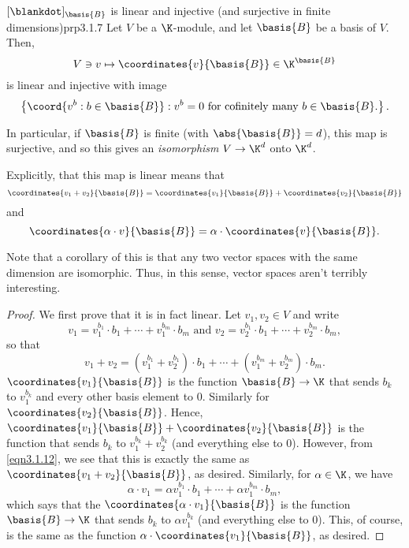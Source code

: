 \begin{prp}{$[\blankdot ]_{\basis{B}}$ is linear and injective (and surjective in finite dimensions)}{prp3.1.7}
Let $V$ be a $\K$-module, and let $\basis{B}$ be a basis of $V$.  Then,
\begin{equation}
	V\ni v\mapsto \coordinates{v}{\basis{B}}\in \K ^{\basis{B}}
\end{equation}
is linear and injective with image
\begin{equation}
	\left\{ \coord{v^b:b\in \basis{B}}:v^b=0\text{ for cofinitely many }b\in \basis{B}\text{.}\right\} .
\end{equation}
\begin{rmk}
	In particular, if $\basis{B}$ is finite (with $\abs{\basis{B}}=d$), this map is surjective, and so this gives an \emph{isomorphism} $V\rightarrow \K ^d$ onto $\K ^d$.
\end{rmk}
\begin{rmk}
	Explicitly, that this map is linear means that
	\begin{equation}
		\coordinates{v_1+v_2}{\basis{B}}=\coordinates{v_1}{\basis{B}}+\coordinates{v_2}{\basis{B}}
	\end{equation}
	and
	\begin{equation}
		\coordinates{\alpha \cdot v}{\basis{B}}=\alpha \cdot \coordinates{v}{\basis{B}}.
	\end{equation}
\end{rmk}
\begin{rmk}
	Note that a corollary of this is that any two vector spaces with the same dimension are isomorphic.  Thus, in this sense, vector spaces aren't terribly interesting.
\end{rmk}
\begin{proof}
	We first prove that it is in fact linear.  Let $v_1,v_2\in V$ and write
	\begin{equation}
		v_1=v_1^{b_1}\cdot b_1+\cdots +v_1^{b_m}\cdot b_m\text{ and }v_2=v_2^{b_1}\cdot b_1+\cdots +v_2^{b_m}\cdot b_m,
	\end{equation}
	so that
	\begin{equation}\label{eqn3.1.12}
		v_1+v_2=(v_1^{b_1}+v_2^{b_1})\cdot b_1+\cdots +(v_1^{b_m}+v_2^{b_m})\cdot b_m.
	\end{equation}
	$\coordinates{v_1}{\basis{B}}$ is the function $\basis{B}\rightarrow \K$ that sends $b_k$ to $v_1^{b_k}$ and every other basis element to $0$.  Similarly for $\coordinates{v_2}{\basis{B}}$.  Hence, $\coordinates{v_1}{\basis{B}}+\coordinates{v_2}{\basis{B}}$ is the function that sends $b_k$ to $v_1^{b_k}+v_2^{b_k}$ (and everything else to $0$).  However, from \eqref{eqn3.1.12}, we see that this is exactly the same as $\coordinates{v_1+v_2}{\basis{B}}$, as desired.  Similarly, for $\alpha \in \K$, we have
	\begin{equation}
		\alpha \cdot v_1=\alpha v_1^{b_1}\cdot b_1+\cdots +\alpha v_1^{b_m}\cdot b_m,
	\end{equation}
	which says that the $\coordinates{\alpha \cdot v_1}{\basis{B}}$ is the function $\basis{B}\rightarrow \K$ that sends $b_k$ to $\alpha v_1^{b_k}$ (and everything else to $0$).  This, of course, is the same as the function $\alpha \cdot \coordinates{v_1}{\basis{B}}$, as desired.
	

\end{proof}
\end{prp}
